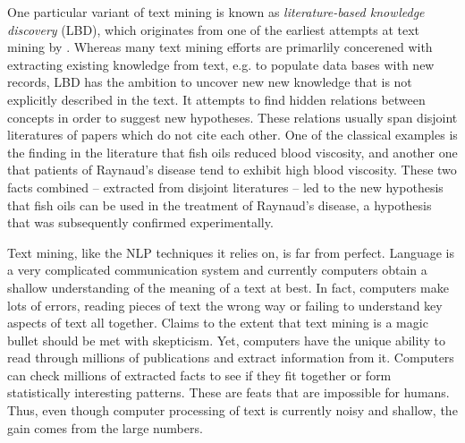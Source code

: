 One particular variant of text mining is known as\emph{ literature-based knowledge discovery} (LBD), which originates from one of the earliest attempts at text mining by \citet{swa86a}.
Whereas many text mining efforts are primarlily concerened with extracting existing knowledge from text, e.g. to populate data bases with new records, LBD has the ambition to uncover new new knowledge that is not explicitly described in the text.
It attempts to find hidden relations between concepts in order to suggest new hypotheses.
These relations usually span disjoint literatures of papers which do not cite each other. 
One of the classical examples is the finding in the literature that fish oils reduced blood viscosity, and another one that patients of Raynaud's disease tend to exhibit high blood viscosity. 
These two facts combined -- extracted from disjoint literatures -- led to the new hypothesis that fish oils can be used in the treatment of Raynaud's disease, a hypothesis that was subsequently confirmed experimentally.

Text mining, like the NLP techniques it relies on, is far from perfect.
Language is a very complicated communication system and currently computers obtain a shallow understanding of the meaning of a text at best.
In fact, computers make lots of errors, reading pieces of text the wrong way or failing to understand key aspects of text all together.
Claims to the extent that text mining is a magic bullet should be met with skepticism. 
Yet, computers have the unique ability to read through millions of publications and extract information from it.
Computers can check millions of extracted facts to see if they fit together or form statistically interesting patterns.
These are feats that are impossible for humans.
Thus, even though computer processing of text is currently noisy and shallow, the gain comes from the large numbers.

